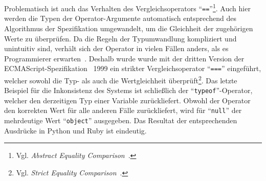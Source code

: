 Problematisch ist auch das Verhalten des Vergleichsoperators \enquote{\texttt{==}}\footnote{Vgl. \textit{Abstract Equality Comparison}~\autocite[Abschnitt 7.2.14]{ECMASCRIPT:2019}.}. Auch hier werden die Typen der Operator-Argumente automatisch entsprechend des Algorithmus der Spezifikation umgewandelt, um die Gleichheit der zugehörigen Werte zu überprüfen. Da die Regeln der Typumwandlung kompliziert und unintuitiv sind, verhält sich der Operator in vielen Fällen anders, als es Programmierer erwarten~\autocite{PRADEL:2015}. Deshalb wurde wurde mit der dritten Version der ECMAScript-Spezifikation~\autocite{ECMASCRIPT:1999} 1999 ein strikter Vergleichsoperator \enquote{\texttt{===}} eingeführt, welcher sowohl die Typ- als auch die Wertgleichheit überprüft\footnote{Vgl. \textit{Strict Equality Comparison}~\autocite[Abschnitt 7.2.15]{ECMASCRIPT:2019}.}.
Das letzte Beispiel für die Inkonsistenz des Systems ist schließlich der \enquote{\texttt{typeof}}-Operator, welcher den derzeitigen Typ einer Variable zurückliefert. Obwohl der Operator den korrekten Wert für alle anderen Fälle zurückliefert, wird für \enquote{\texttt{null}} der mehrdeutige Wert \enquote{\texttt{object}} ausgegeben. Das Resultat der entsprechenden Ausdrücke in Python und Ruby ist eindeutig.


